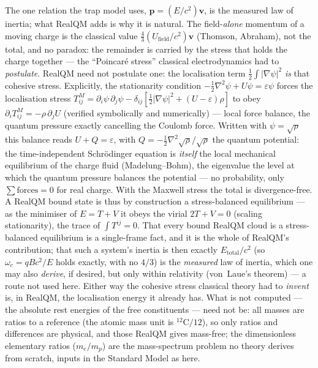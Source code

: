 The one relation the trap model uses, $\mathbf p=(E/c^2)\mathbf v$, is the measured law of inertia; what RealQM
adds is why it is natural. The field-\emph{alone} momentum of a moving charge is the classical value
$\tfrac43(U_{\text{field}}/c^2)\mathbf v$ (Thomson, Abraham), not the total, and no paradox: the remainder is
carried by the stress that holds the charge together --- the ``Poincar\'e stress'' classical electrodynamics had to
\emph{postulate}. RealQM need not postulate one: the localisation term
$\tfrac12\int|\nabla\psi|^2$ \emph{is} that cohesive stress. Explicitly, the stationarity condition
$-\tfrac12\nabla^2\psi+U\psi=\varepsilon\psi$ forces the localisation stress
$T^{M}_{ij}=\partial_i\psi\,\partial_j\psi-\delta_{ij}[\tfrac12|\nabla\psi|^2+(U-\varepsilon)\rho]$ to obey
$\partial_i T^{M}_{ij}=-\rho\,\partial_j U$ (verified symbolically and numerically) --- local force balance, the
quantum pressure exactly cancelling the Coulomb force. Written with $\psi=\sqrt\rho$ this balance reads
$U+Q=\varepsilon$, with $Q=-\tfrac12\nabla^2\sqrt\rho/\sqrt\rho$ the quantum potential: the time-independent
Schr\"odinger equation is \emph{itself} the local mechanical equilibrium of the charge fluid (Madelung--Bohm), the
eigenvalue the level at which the quantum pressure balances the potential --- no probability, only
$\sum\text{forces}=0$ for real charge. With the Maxwell stress the total is divergence-free. A
RealQM bound state is thus by construction a stress-balanced equilibrium --- as the minimiser of $E=T+V$ it obeys
the virial $2T+V=0$ (scaling stationarity),
the trace of $\int T^{ij}=0$. That every bound RealQM cloud is a stress-balanced equilibrium is a single-frame
fact, and it is the whole of RealQM's contribution; that such a system's inertia is then exactly
$E_{\text{total}}/c^2$ (so $\omega_c=qBc^2/E$ holds exactly, with no $4/3$) is the \emph{measured} law of inertia,
which one may also \emph{derive}, if desired, but only within relativity (von~Laue's theorem) --- a route not used
here. Either way the cohesive stress classical theory had to \emph{invent} is, in RealQM, the localisation energy
it already has. What is not computed --- the absolute rest energies of the free constituents --- need not be: all masses
are ratios to a reference (the atomic mass unit is $^{12}$C$/12$), so only ratios and differences are physical,
and those RealQM gives mass-free; the dimensionless elementary ratios ($m_e/m_p$) are the mass-spectrum problem
no theory derives from scratch, inputs in the Standard Model as here.

